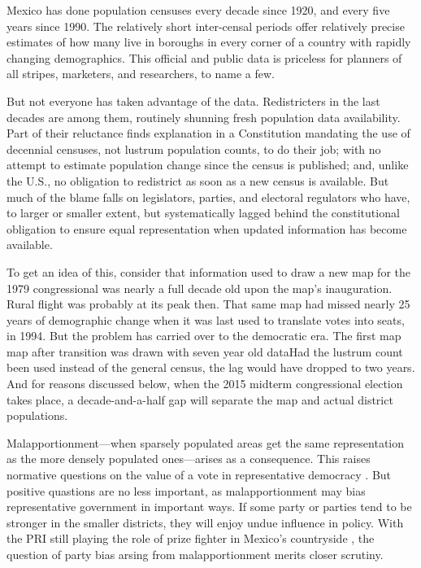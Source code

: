 \documentclass[letter,12pt]{article}
\begin{document}
\onehalfspacing

\noindent Mexico has done population censuses every decade since 1920, and every five years since 1990. The relatively short inter-censal periods offer relatively precise estimates of how many live in boroughs in every corner of a country with rapidly changing demographics. This official and public data is priceless for planners of all stripes, marketers, and researchers, to name a few. 

But not everyone has taken advantage of the data. Redistricters in the last decades are among them, routinely shunning fresh population data availability. Part of their reluctance finds explanation in a Constitution mandating the use of decennial censuses, not lustrum population counts, to do their job; with no attempt to estimate population change since the census is published; and, unlike the U.S., no obligation to redistrict as soon as a new census is available. But much of the blame falls on legislators, parties, and electoral regulators who have, to larger or smaller extent, but systematically lagged behind the constitutional obligation to ensure equal representation when updated information has become available. 

To get an idea of this, consider that information used to draw a new map for the 1979 congressional was nearly a full decade old upon the map's inauguration. Rural flight was probably at its peak then. That same map had missed nearly 25 years of demographic change when it was last used to translate votes into seats, in 1994. But the problem has carried over to the democratic era. The first map map after transition was drawn with seven year old dataHad the lustrum count been used instead of the general census, the lag would have dropped to two years. And for reasons discussed below, when the 2015 midterm congressional election takes place, a decade-and-a-half gap will separate the map and actual district populations. 

Malapportionment---when sparsely populated areas get the same representation as the more densely populated ones---arises as a consequence. This raises normative questions on the value of a vote in representative democracy \citep{cox.1987,balinskiYoung2001FairRep,dahl.1972}. But positive quastions are no less important, as malapportionment may bias representative government in important ways. If some party or parties tend to be stronger in the smaller districts, they will enjoy undue influence in policy. With the PRI still playing the role of prize fighter in Mexico's countryside \citep{amesMex.1970,magar.1994}, the question of party bias arsing from malapportionment merits closer scrutiny. 
\end{document}

